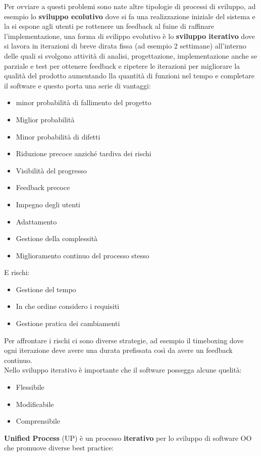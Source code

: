 \documentclass{article}
\begin{document}
Per ovviare a questi problemi sono nate altre tipologie di processi di sviluppo, ad esempio lo \textbf{sviluppo ecolutivo} dove si fa una realizzazione iniziale del sistema e la si espone agli utenti pe rottenere un feedback al fuine di raffinare l'implementazione, una forma di svilippo evolutivo è lo \textbf{sviluppo iterativo} dove si lavora in iterazioni di breve dirata fissa (ad esempio 2 settimane) all'interno delle quali si svolgono attività di analisi, progettazione, implementazione anche se parziale e test per ottenere feedback e ripetere le iterazioni per migliorare la qualità del prodotto aumentando lla quantità di funzioni nel tempo e completare il software e questo porta una serie di vantaggi:
\begin{itemize}
  \item minor probabilità di fallimento del progetto
  \item Miglior probabilità
  \item Minor probabilità di difetti
  \item Riduzione precoce anziché tardiva dei rischi
  \item Visibilità del progresso
  \item Feedback precoce
  \item Impegno degli utenti
  \item Adattamento
  \item Gestione della complessità
  \item Miglioramento continuo del processo stesso
\end{itemize}
E rischi:
\begin{itemize}
  \item Gestione del tempo
  \item In che ordine considero i requisiti
  \item Gestione pratica dei cambiamenti
\end{itemize}
Per affrontare i rischi ci sono diverse strategie, ad esempio il timeboxing dove ogni iterazione deve avere una durata prefissata così da avere un feedback continuo.\\
Nello sviluppo iterativo è importante che il software possegga alcune quelità:
\begin{itemize}
  \item Flessibile
  \item Modificabile
  \item Comprensibile
\end{itemize}
\textbf{Unified Process} (UP) è un processo \textbf{iterativo} per lo sviluppo di software OO che promuove diverse best practice:
\end{document}

